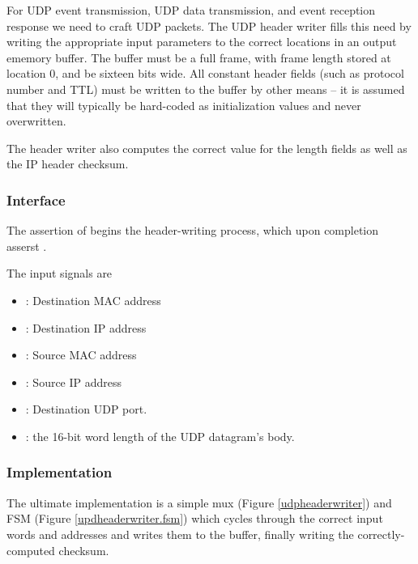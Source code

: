 For UDP event transmission, UDP data transmission, and event reception
response we need to craft UDP packets. The UDP header writer fills
this need by writing the appropriate input parameters to the correct
locations in an output ememory buffer. The buffer must be a full
frame, with frame length stored at location 0, and be sixteen bits
wide. All constant header fields (such as protocol number and TTL)
must be written to the buffer by other means -- it is assumed that
they will typically be hard-coded as initialization values and never
overwritten.


The header writer also computes the correct value for the length
fields as well as the IP header checksum.

\subsubsection{Interface}
The assertion of  begins the header-writing process, which upon completion asserst . 

The input signals are

\begin{itemize}
\item {} : Destination MAC address
\item {} : Destination IP address
\item {} : Source MAC address
\item {} : Source IP address
\item {} : Destination UDP port. 
\item {} : the 16-bit word length of the UDP datagram's body. 
\end{itemize}

\subsubsection{Implementation}

The ultimate implementation is a simple mux (Figure \ref{udpheaderwriter})  and FSM (Figure \ref{updheaderwriter.fsm}) which cycles through the correct input words and addresses and writes them to the buffer, finally writing the correctly-computed checksum. 


